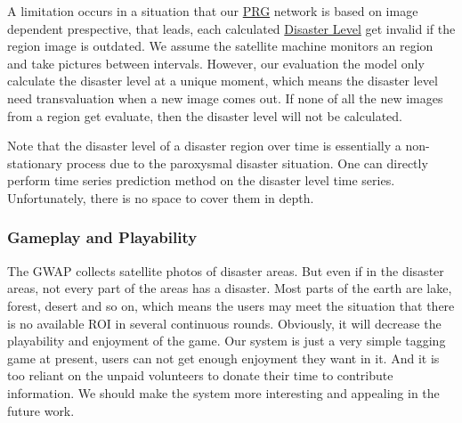 A limitation occurs in a situation that our \hyperref[idx:prg]{PRG} network is based on image dependent prespective, that leads,
each calculated \hyperref[def:dl]{Disaster Level} get invalid if the region image is outdated.
We assume the satellite machine monitors an region and take pictures between intervals. 
However, our evaluation the model only calculate the disaster level at a unique moment, 
which means the disaster level need transvaluation when a new image comes out.
If none of all the new images from a region get evaluate, then the disaster level will not be calculated.

Note that the disaster level of a disaster region over time is essentially a non-stationary process \cite{brockwell2013time} 
due to the paroxysmal disaster situation. One can directly perform time series prediction method \cite{kuznetsov2015learning}
on the disaster level time series. 
Unfortunately, there is no space to cover them in depth.

\subsubsection{Gameplay and Playability}

The GWAP collects satellite photos of disaster areas. But even if in the disaster areas, 
not every part of the areas has a disaster. Most parts of the earth are lake, forest, 
desert and so on, which means the users may meet the situation that there is no available 
ROI in several continuous rounds. Obviously, it will decrease the playability and enjoyment of the game.
Our system is just a very simple tagging game at present, users can not get enough enjoyment they want in it. 
And it is too reliant on the unpaid volunteers to donate their time to contribute information. 
We should make the system more interesting and appealing in the future work.